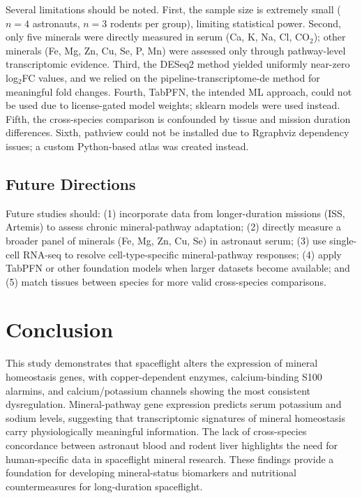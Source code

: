 \documentclass[11pt,a4paper]{article}
\begin{document}
Several limitations should be noted. First, the sample size is extremely small ($n=4$ astronauts, $n=3$ rodents per group), limiting statistical power. Second, only five minerals were directly measured in serum (Ca, K, Na, Cl, CO$_2$); other minerals (Fe, Mg, Zn, Cu, Se, P, Mn) were assessed only through pathway-level transcriptomic evidence. Third, the DESeq2 method yielded uniformly near-zero log$_2$FC values, and we relied on the pipeline-transcriptome-de method for meaningful fold changes. Fourth, TabPFN, the intended ML approach, could not be used due to license-gated model weights; sklearn models were used instead. Fifth, the cross-species comparison is confounded by tissue and mission duration differences. Sixth, pathview could not be installed due to Rgraphviz dependency issues; a custom Python-based atlas was created instead.

\subsection{Future Directions}

Future studies should: (1) incorporate data from longer-duration missions (ISS, Artemis) to assess chronic mineral-pathway adaptation; (2) directly measure a broader panel of minerals (Fe, Mg, Zn, Cu, Se) in astronaut serum; (3) use single-cell RNA-seq to resolve cell-type-specific mineral-pathway responses; (4) apply TabPFN or other foundation models when larger datasets become available; and (5) match tissues between species for more valid cross-species comparisons.

\section{Conclusion}

This study demonstrates that spaceflight alters the expression of mineral homeostasis genes, with copper-dependent enzymes, calcium-binding S100 alarmins, and calcium/potassium channels showing the most consistent dysregulation. Mineral-pathway gene expression predicts serum potassium and sodium levels, suggesting that transcriptomic signatures of mineral homeostasis carry physiologically meaningful information. The lack of cross-species concordance between astronaut blood and rodent liver highlights the need for human-specific data in spaceflight mineral research. These findings provide a foundation for developing mineral-status biomarkers and nutritional countermeasures for long-duration spaceflight.
\end{document}
